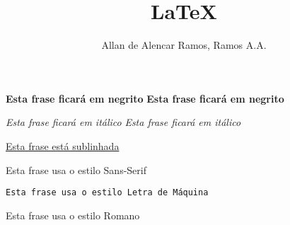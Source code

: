 \documentclass[12pt, a4paper]{article}
\begin{document}
\title{LaTeX}
\author{Allan de Alencar Ramos, Ramos A.A.}
\maketitle

\textbf{Esta frase ficará em negrito}\newline
\bfseries{Esta frase ficará em negrito}\newline

\textit{Esta frase ficará em itálico}\newline
\itshape{Esta frase ficará em itálico}\newline

\underline{Esta frase está sublinhada}\newline

\textsf{Esta frase usa o estilo Sans-Serif}\newline
{}\newline

\texttt{Esta frase usa o estilo Letra de Máquina }\newline
{}\newline

\textrm{Esta frase usa o estilo Romano}\newline
{}\newline
\end{document}
